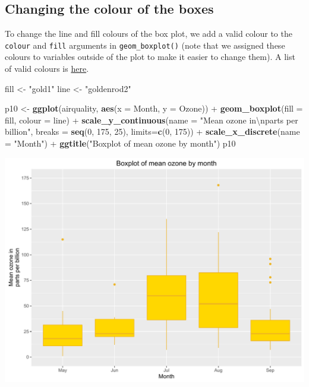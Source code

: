 \documentclass[]{article}
\newenvironment{Shaded}{\begin{snugshade}}{\end{snugshade}}
\newcommand{\KeywordTok}[1]{\textcolor[rgb]{0.13,0.29,0.53}{\textbf{{#1}}}}
\newcommand{\DataTypeTok}[1]{\textcolor[rgb]{0.13,0.29,0.53}{{#1}}}
\newcommand{\DecValTok}[1]{\textcolor[rgb]{0.00,0.00,0.81}{{#1}}}
\newcommand{\CharTok}[1]{\textcolor[rgb]{0.31,0.60,0.02}{{#1}}}
\newcommand{\StringTok}[1]{\textcolor[rgb]{0.31,0.60,0.02}{{#1}}}
\newcommand{\NormalTok}[1]{{#1}}
\begin{document}
\subsection{Changing the colour of the
boxes}\label{changing-the-colour-of-the-boxes}

To change the line and fill colours of the box plot, we add a valid
colour to the \texttt{colour} and \texttt{fill} arguments in
\texttt{geom\_boxplot()} (note that we assigned these colours to
variables outside of the plot to make it easier to change them). A list
of valid colours is
\href{http://www.stat.columbia.edu/~tzheng/files/Rcolor.pdf}{here}.

\begin{Shaded}
\begin{Highlighting}[]
\NormalTok{fill <-}\StringTok{ "gold1"}
\NormalTok{line <-}\StringTok{ "goldenrod2"}

\NormalTok{p10 <-}\StringTok{ }\KeywordTok{ggplot}\NormalTok{(airquality, }\KeywordTok{aes}\NormalTok{(}\DataTypeTok{x =} \NormalTok{Month, }\DataTypeTok{y =} \NormalTok{Ozone)) +}\StringTok{ }
\StringTok{        }\KeywordTok{geom_boxplot}\NormalTok{(}\DataTypeTok{fill =} \NormalTok{fill, }\DataTypeTok{colour =} \NormalTok{line) +}
\StringTok{        }\KeywordTok{scale_y_continuous}\NormalTok{(}\DataTypeTok{name =} \StringTok{"Mean ozone in}\CharTok{\textbackslash{}n}\StringTok{parts per billion"}\NormalTok{,}
                           \DataTypeTok{breaks =} \KeywordTok{seq}\NormalTok{(}\DecValTok{0}\NormalTok{, }\DecValTok{175}\NormalTok{, }\DecValTok{25}\NormalTok{),}
                           \DataTypeTok{limits=}\KeywordTok{c}\NormalTok{(}\DecValTok{0}\NormalTok{, }\DecValTok{175}\NormalTok{)) +}
\StringTok{        }\KeywordTok{scale_x_discrete}\NormalTok{(}\DataTypeTok{name =} \StringTok{"Month"}\NormalTok{) +}
\StringTok{        }\KeywordTok{ggtitle}\NormalTok{(}\StringTok{"Boxplot of mean ozone by month"}\NormalTok{)}
\NormalTok{p10}
\end{Highlighting}
\end{Shaded}

\begin{center}\includegraphics{0_all_posts_pdf/box_6-1} \end{center}
\end{document}
